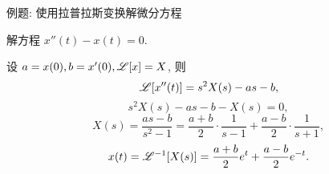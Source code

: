 \begin{frame}{例题: 使用拉普拉斯变换解微分方程}
\begin{example}
解方程 $x''(t)-x(t)=0$.
\end{example}
\begin{solution}
设 $a=x(0),b=x'(0),\mathscr{L}[x]=X$,
\onslide<+->
则
\[\mathscr{L}[x''(t)]=s^2X(s)-as-b,\]
\onslide<+->
\vspace{-\baselineskip}
\[s^2X(s)-as-b-X(s)=0,\]
\onslide<+->
\vspace{-0.8\baselineskip}
\[X(s)=\frac{as-b}{s^2-1}=\frac{a+b}2\cdot\frac1{s-1}+\frac{a-b}2\cdot\frac1{s+1},\]
\onslide<+->
\vspace{-0.8\baselineskip}
\[x(t)=\mathscr{L}^{-1}[X(s)]=\frac{a+b}2e^t+\frac{a-b}2e^{-t}.\]
\end{solution}
\end{frame}
